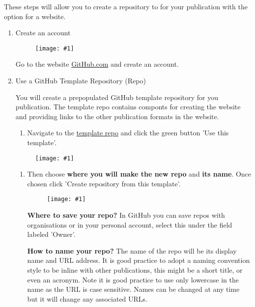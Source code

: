 \documentclass{article}
\newlength{\imgwidth}
\newcommand\scaledgraphics[2]{%
                
\settowidth{\imgwidth}{\texttt{[image: \#1]}}%
                
\setlength{\imgwidth}{\minof{\imgwidth}{#2\textwidth}}%
                
\texttt{[image: \#1]}%
                
}
\begin{document}
These steps will allow you to create a repository to for your publication with the option for a website.

\begin{enumerate}
\item Create an account

\begin{figure}
\scaledgraphics{56369a22-3b5a-4691-aa78-51a8bd4bba37.png}{1}
\label{F22252491}
\end{figure}


Go to the website \href{https://github.com/}{GitHub.com} and create an account.


\item Use a GitHub Template Repository (Repo)


You will create a prepopulated GitHub template repository for you publication. The template repo contains componts for creating the website and providing links to the other publication formats in the website.

\begin{enumerate}
\item Navigate to the \href{https://github.com/gesunheitsamt-frankfurt/publication-git-template}{template repo} and click the green button 'Use this template'.


\end{enumerate}
\begin{figure}
\scaledgraphics{a1372970-e67a-4bd6-ac76-6bd8b5e9c9df.png}{1}
\label{F64968441}
\end{figure}

\begin{enumerate}[start=2]
\item Then choose \textbf{where you will make the new repo} and \textbf{its name}. Once chosen click 'Create repository from this template'.

\begin{figure}
\scaledgraphics{e1a9d7d5-e934-4366-87e6-7b7fe69f5fd1.png}{1}
\label{F34914491}
\end{figure}


\textbf{Where to save your repo?} In GitHub you can save repos with organisations or in your personal account, select this under the field labeled 'Owner'.


\textbf{How to name your repo?} The name of the repo will be its display name and URL address. It is good practice to adopt a naming convention style to be inline with other publications, this might be a short title, or even an acronym. Note it is good practice to use only lowercase in the name as the URL is case sensitive. Names can be changed at any time but it will change any associated URLs.



\end{enumerate}
\end{enumerate}
\end{document}
